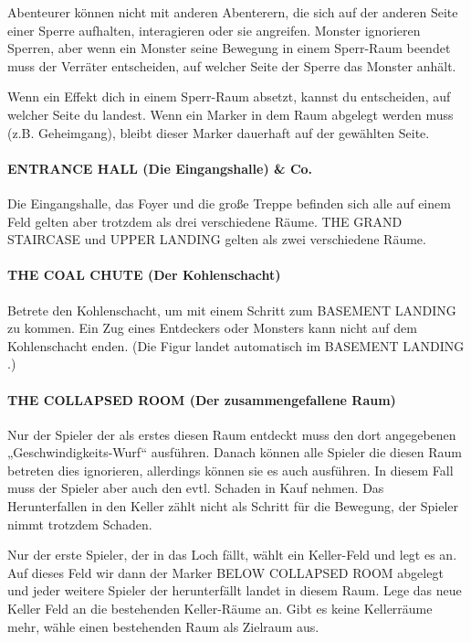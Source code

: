 Abenteurer können nicht mit anderen Abenterern, die sich auf der anderen Seite einer Sperre aufhalten, interagieren oder sie angreifen. Monster ignorieren Sperren, aber wenn ein Monster seine Bewegung in einem Sperr-Raum beendet muss der Verräter entscheiden, auf welcher Seite der Sperre das Monster anhält.

Wenn ein Effekt dich in einem Sperr-Raum absetzt, kannst du entscheiden, auf welcher Seite du landest. Wenn ein Marker in dem Raum abgelegt werden muss (z.B. Geheimgang), bleibt dieser Marker dauerhaft auf der gewählten Seite.

\paragraph{ENTRANCE HALL (Die Eingangshalle) \& Co.}

Die Eingangshalle, das Foyer und die große Treppe befinden sich alle auf einem Feld gelten aber trotzdem als drei verschiedene Räume. THE GRAND STAIRCASE und UPPER LANDING gelten als zwei verschiedene Räume.


\paragraph{THE COAL CHUTE (Der Kohlenschacht)}

Betrete den Kohlenschacht, um mit einem Schritt zum BASEMENT LANDING zu kommen. Ein Zug eines Entdeckers oder Monsters kann nicht auf dem Kohlenschacht enden. (Die Figur landet automatisch im BASEMENT LANDING .)

\paragraph{THE COLLAPSED ROOM (Der zusammengefallene Raum)}

Nur der Spieler der als erstes diesen Raum entdeckt muss den dort angegebenen „Geschwindigkeits-Wurf“ ausführen. Danach können alle Spieler die diesen Raum betreten dies ignorieren, allerdings können sie es auch ausführen. In diesem Fall muss der Spieler aber auch den evtl. Schaden in Kauf nehmen. Das Herunterfallen in den Keller zählt nicht als Schritt für die Bewegung, der Spieler nimmt trotzdem Schaden.

Nur der erste Spieler, der in das Loch fällt, wählt ein Keller-Feld und legt es an. Auf dieses Feld wir dann der Marker BELOW COLLAPSED ROOM abgelegt und jeder weitere Spieler der herunterfällt landet in diesem Raum. Lege das neue Keller Feld an die bestehenden Keller-Räume an. Gibt es keine Kellerräume mehr, wähle einen bestehenden Raum als Zielraum aus.


